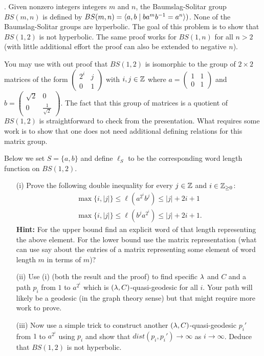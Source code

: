 \documentclass[12pt]{amsart}
\begin{document}
. Given nonzero integers integers $m$ and $n$, the Baumslag-Solitar group $BS(m,n)$ is defined by $BS(m,n)={\langle} a,b \mid ba^m b^{-1}=a^n{\rangle})$.
None of the Baumslag-Solitar groups are hyperbolic. The goal of this problem is to show that $BS(1,2)$ is not hyperbolic. The same proof
works for $BS(1,n)$ for all $n>2$ (with little additional effort the proof can also be extended to negative $n$).

You may use with out proof that $BS(1,2)$ is isomorphic to the group of $2\times 2$ matrices of the form 
$\begin{pmatrix}2^i & j \\ 0 & 1 \end{pmatrix}$ with $i,j\in{\mathbb Z}$ where $a=\begin{pmatrix}1 & 1 \\ 0 & 1 \end{pmatrix}$
and $b=\begin{pmatrix}\sqrt{2} & 0 \\ 0 & \frac{1}{\sqrt{2}} \end{pmatrix}$. The fact that this group of matrices is a quotient of $BS(1,2)$ is straightforward
to check from the presentation. What requires some work is to show that one does not need additional defining relations for this matrix group.

Below we set $S=\{a,b\}$ and define $\ell_S$ to be the corresponding word length function on $BS(1,2)$.

\begin{itemize}
\item[(i)] Prove the following double inequality for every $j\in{\mathbb Z}$ and $i\in {\mathbb Z}_{\geq 0}$:
\begin{gather}
\max\{i,|j|\}\leq \ell(a^{2^i} b^j)\leq |j|+2i+1\\
\max\{i,|j|\}\leq \ell(b^j a^{2^i})\leq |j|+2i+1.
\end{gather}
{\bf Hint:} For the upper bound find an explicit word of that length representing the above element. For the lower bound use the matrix representation (what can use say about the entries of a matrix representing some element of word length $m$ in terms of $m$)?

\item[(ii)] Use (i) (both the result and the proof) to find specific ${\lambda}$ and $C$ and a path $p_i$ from $1$ to $a^{2^i}$
which is $({\lambda},C)$-quasi-geodesic for all $i$. Your path will likely be a geodesic (in the graph theory sense) but
that might require more work to prove.

\item[(iii)] Now use a simple trick to construct another  $({\lambda},C)$-quasi-geodesic $p_i'$ from $1$ to $a^{2^i}$ using $p_i$
and show that $dist(p_i,p_i')\to \infty$ as $i\to \infty$. Deduce that $BS(1,2)$ is not hyperbolic.

\end{itemize}
\end{document}
